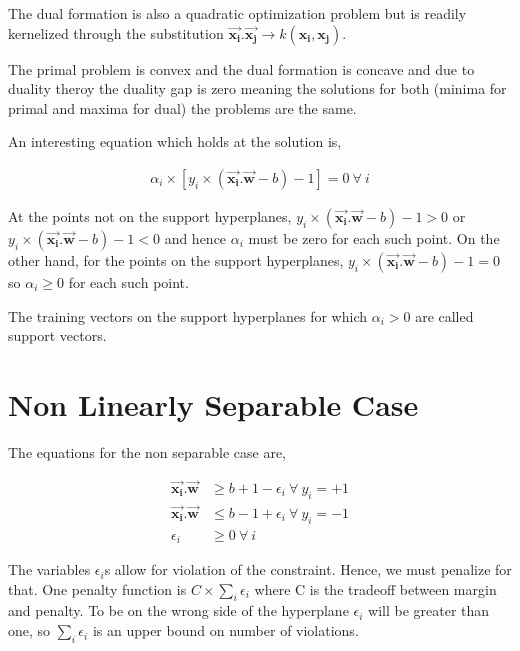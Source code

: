 \documentclass[11pt, a4paper]{article}
\begin{document}
The dual formation is also a quadratic optimization problem but is readily kernelized through the substitution $\vec{\mathbf{x_i}} . \vec{\mathbf{x_j}} \rightarrow k(\mathbf{x_i}, \mathbf{x_j})$.

The primal problem is convex and the dual formation is concave and due to duality theroy the duality gap is zero meaning the solutions for both (minima for primal and maxima for dual) the problems are the same.

An interesting equation which holds at the solution is,

\begin{align*}
	\alpha_i \times [y_i \times (\vec{\mathbf{x_i}}.\vec{\mathbf{w}} - b) - 1] = 0\ \forall\ i 
\end{align*}

At the points not on the support hyperplanes, $y_i \times (\vec{\mathbf{x_i}}.\vec{\mathbf{w}} - b) - 1 > 0$ or $y_i \times (\vec{\mathbf{x_i}}.\vec{\mathbf{w}} - b) - 1 < 0$ and hence $\alpha_i$ must be zero for each such point. On the other hand, for the points on the support hyperplanes, $y_i \times (\vec{\mathbf{x_i}}.\vec{\mathbf{w}} - b) - 1 = 0$ so $\alpha_i \geq 0$ for each such point. 

The training vectors on the support hyperplanes for which $\alpha_i > 0$ are called support vectors.

\section{Non Linearly Separable Case}

The equations for the non separable case are, 

\begin{align*}
	\vec{\mathbf{x_{i}}}.\vec{\mathbf{w}} & \geq b + 1 - \epsilon_i\ \forall\ y_i = +1 \\
	\vec{\mathbf{x_{i}}}.\vec{\mathbf{w}} & \leq b - 1 + \epsilon_i\ \forall\ y_i = -1 \\ 
	\epsilon_i                            & \geq 0\ \forall\ i                         
\end{align*}

The variables $\epsilon_i$s allow for violation of the constraint. Hence, we must penalize for that. One penalty function is $C \times \sum\limits_i \epsilon_i$ where C is the tradeoff between margin and penalty. To be on the wrong side of the hyperplane $\epsilon_i$ will be greater than one, so $\sum\limits_i \epsilon_i$ is an upper bound on number of violations.
\end{document}
